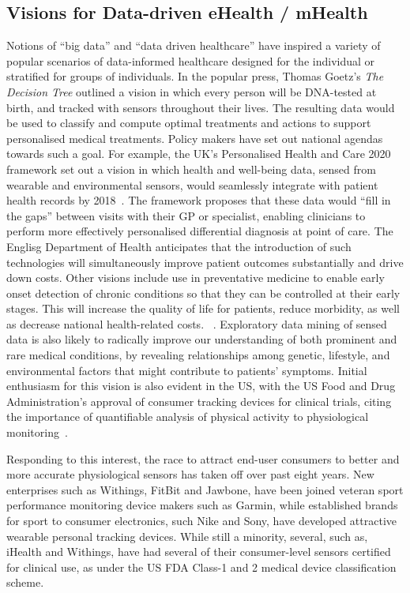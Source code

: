 \documentclass{sigchi}
\begin{document}
\subsection{Visions for Data-driven eHealth / mHealth}
Notions of ``big data'' and ``data driven healthcare'' have inspired a variety of popular scenarios  of data-informed healthcare designed for the individual or stratified for groups of individuals. In the popular press, Thomas Goetz's \emph{The Decision Tree} outlined a vision in which every person will be DNA-tested at birth, and tracked with sensors throughout their lives. The resulting data would be used to classify and compute optimal treatments and actions to support personalised medical treatments. Policy makers have set out national agendas towards such a goal. For example, the UK's Personalised Health and Care 2020 framework set out a vision in which health and well-being data, sensed from wearable and environmental sensors, would seamlessly integrate with patient health records by 2018~\cite{Personalised2014}.  The framework proposes that these data would ``fill in the gaps'' between visits with their GP or specialist, enabling clinicians to perform more effectively personalised differential diagnosis at point of care.  The Englisg Department of Health anticipates that the introduction of such technologies will simultaneously improve patient outcomes substantially and drive down costs.  Other visions include use in preventative medicine to enable early onset detection of chronic conditions so that they can be controlled at their early stages.  This will increase the quality of life for patients, reduce morbidity, as well as decrease national health-related costs. ~\cite{Swan2009}.  Exploratory data mining of sensed data is also likely to radically improve our understanding of both prominent and rare medical conditions, by revealing relationships among genetic, lifestyle, and environmental factors that might contribute to patients' symptoms.  Initial enthusiasm for this vision is also evident in the US, with the US Food and Drug Administration's approval of  consumer tracking devices for clinical trials, citing the importance of quantifiable analysis of physical activity to physiological monitoring~\cite{U.S.FoodandDrugAdministration2014}.



Responding to this interest, the race to attract end-user consumers to better and more accurate physiological sensors has taken off over past eight years. New enterprises such as Withings, FitBit and Jawbone, have been joined veteran sport performance monitoring device makers such as Garmin, while established brands for sport to consumer electronics, such Nike and Sony, have developed attractive wearable personal tracking devices.  While still a minority, several, such as, iHealth and Withings, have had several of their consumer-level sensors certified for clinical use, as under the US FDA Class-1 and 2 medical device classification scheme. 
\end{document}
